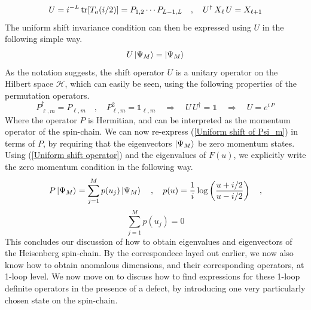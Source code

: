 %
%
\begin{equation}\label{Uniform shift operator}
U = i^{-L} \tr [ T_a(i / 2) ]
=
P_{1,2} \cdots P_{L-1,L}
%
\quad , \quad
%
U^\dagger \, X_\ell \, U = X_{\ell+1}
\end{equation}
%
%
The uniform shift invariance condition can then be expressed using $U$ in the following simple way.
%
%
\begin{equation}\label{Uniform shift of Psi_m}
U \ket{\Psi_M} = \ket{\Psi_M}
\end{equation}
%
%
As the notation suggests, the shift operator $U$ is a unitary operator on the Hilbert space $\mathcal{H}$, which can easily be seen, using the following properties of the permutation operators.
%
%
\begin{equation}
P_{\ell,m}^\dagger = P_{\ell,m}
%
\quad , \quad
%
P^2_{\ell,m} = \mathbb{1}_{\ell,m}
%
\quad \Rightarrow \quad
%
U \, U^\dagger = \mathbb{1}
%
\quad \Rightarrow \quad
%
U = e^{i \, P}
\end{equation}
%
%
Where the operator $P$ is Hermitian, and can be interpreted as the momentum operator of the spin-chain. We can now re-express (\ref{Uniform shift of Psi_m}) in terms of $P$, by requiring that the eigenvectors $\ket{\Psi_M}$ be zero momentum states. Using (\ref{Uniform shift operator}) and the eigenvalues of $F(u)$, we explicitly write the zero momentum condition in the following way.
%
%
\begin{equation*}
P \ket{\Psi_M} = \sum_{j=1}^M p(u_j) \ket{\Psi_M}
%
\quad , \quad
%
p(u)
=
\frac{1}{i}
\log \left( \frac{u + i / 2}{u - i / 2} \right)
%
\quad ,
\end{equation*}
%
%
\begin{equation}\label{spin-chain momentum}
\sum_{j=1}^M p(u_j) = 0
\end{equation}
%
%
This concludes our discussion of how to obtain eigenvalues and eigenvectors of the Heisenberg spin-chain. By the correspondece layed out earlier, we now also know how to obtain anomalous dimensions, and their corresponding operators, at 1-loop level. We now move on to discuss how to find expressions for these 1-loop definite operators in the presence of a defect, by introducing one very particularly chosen state on the spin-chain.

